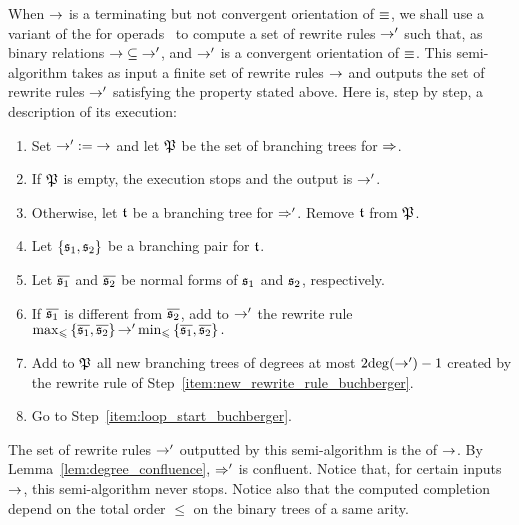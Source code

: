 When $\operatorname{\to}$ is a terminating but not convergent orientation of $\operatorname{\equiv}$,
we shall use a variant of the  for
operads~\cite[Section 3.7]{DK10} to compute a set of rewrite rules
$\operatorname{\to}'$ such that, as binary relations $\operatorname{\to} \subseteq \operatorname{\to}'$, and
$\operatorname{\to}'$ is a convergent orientation of $\operatorname{\equiv}$. This semi-algorithm
takes as input a finite set of rewrite rules $\operatorname{\to}$ and outputs the set
of rewrite rules $\operatorname{\to}'$ satisfying the property stated above. Here is,
step by step, a description of its execution:
\begin{enumerate}[label={(\it\arabic*)}]
    \item Set $\operatorname{\to}' := \operatorname{\to}$ and let $\mathfrak{P}$ be the set of
    branching trees for $\operatorname{\Rightarrow}$.
    \smallbreak

    \item \label{item:loop_start_buchberger}
    If $\mathfrak{P}$ is empty, the execution stops and the output
    is $\operatorname{\to}'$.
    \smallbreak

  \item Otherwise, let $\mathfrak{t}$ be a branching tree for $\operatorname{\Rightarrow}'$.
    Remove $\mathfrak{t}$ from $\mathfrak{P}$.
    \smallbreak

    \item Let $\{\mathfrak{s}_1, \mathfrak{s}_2\}$ be a branching pair for $\mathfrak{t}$.
    \smallbreak

  \item Let $\overline{\mathfrak{s}_1}$ and $\overline{\mathfrak{s}_2}$ be normal forms
    of $\mathfrak{s}_1$ and $\mathfrak{s}_2$, respectively.
    \smallbreak

    \item \label{item:new_rewrite_rule_buchberger}
      If $\overline{\mathfrak{s}_1}$ is different from $\overline{\mathfrak{s}_2}$, add
      to $\operatorname{\to}'$ the rewrite rule
    \begin{math}
        \max_\leqslant \left\{\overline{\mathfrak{s}_1}, \overline{\mathfrak{s}_2}\right\}
        \operatorname{\to}'
        \min_\leqslant \left\{\overline{\mathfrak{s}_1}, \overline{\mathfrak{s}_2}\right\}.
    \end{math}
    \smallbreak

    \item Add to $\mathfrak{P}$ all new branching trees of degrees at
    most $2 \mathrm{deg}(\operatorname{\to}') - 1$ created by the rewrite rule of
    Step~\ref{item:new_rewrite_rule_buchberger}.
    \smallbreak

    \item Go to Step~\ref{item:loop_start_buchberger}.
\end{enumerate}
The set of rewrite rules $\operatorname{\to}'$ outputted by this semi-algorithm is the
 of $\operatorname{\to}$. By Lemma~\ref{lem:degree_confluence},
$\operatorname{\Rightarrow}'$ is confluent. Notice that, for certain inputs $\operatorname{\to}$,
this semi-algorithm never stops. Notice also that the computed
completion depend on the total order $\leq$ on the binary trees of a
same arity.
\medbreak
